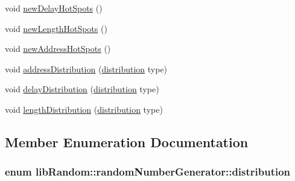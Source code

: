 \begin{CompactItemize}
\begin{CompactItemize}
\item 
void \hyperlink{classlibRandom_1_1randomNumberGenerator_0512eb91f14d32ca127f415d3a51c77a}{newDelayHotSpots} ()
\item 
void \hyperlink{classlibRandom_1_1randomNumberGenerator_b756203d399589ae010b34397d6e47a6}{newLengthHotSpots} ()
\item 
void \hyperlink{classlibRandom_1_1randomNumberGenerator_2ab4ece084ac0ae7b65dff04ce52787b}{newAddressHotSpots} ()
\item 
void \hyperlink{classlibRandom_1_1randomNumberGenerator_7fa20dc1666eecd8615725c32859e8fd}{addressDistribution} (\hyperlink{classlibRandom_1_1randomNumberGenerator_3bfd56b7b47f4593167e59916a555562}{distribution} type)
\item 
void \hyperlink{classlibRandom_1_1randomNumberGenerator_80d640f561800b1a4676c5e3324b180a}{delayDistribution} (\hyperlink{classlibRandom_1_1randomNumberGenerator_3bfd56b7b47f4593167e59916a555562}{distribution} type)
\item 
void \hyperlink{classlibRandom_1_1randomNumberGenerator_5167967f2fef78e42b6cf203520accaa}{lengthDistribution} (\hyperlink{classlibRandom_1_1randomNumberGenerator_3bfd56b7b47f4593167e59916a555562}{distribution} type)
\end{CompactItemize}


\subsection{Member Enumeration Documentation}
\hypertarget{classlibRandom_1_1randomNumberGenerator_3bfd56b7b47f4593167e59916a555562}{
\subsubsection[{distribution}]{\setlength{\rightskip}{0pt plus 5cm}enum {\bf libRandom::randomNumberGenerator::distribution}}}
\label{classlibRandom_1_1randomNumberGenerator_3bfd56b7b47f4593167e59916a555562}



\end{CompactItemize}
